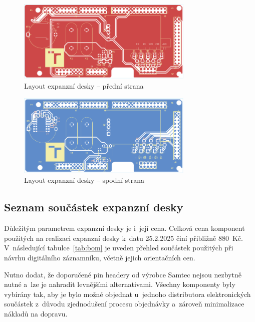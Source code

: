 \begin{figure}[h]
    \centering
    \includegraphics[width=0.75\textwidth]{obrazky-figures/extension_shield-brd-front.pdf}
    
    \caption{Layout expanzní desky -- přední strana}
    \label{fig:layout-front}
\end{figure}

\begin{figure}[h]
    \centering
    \includegraphics[width=0.75\textwidth]{obrazky-figures/extension_shield-brd-back.pdf}
    
    \caption{Layout expanzní desky -- spodní strana}
    \label{fig:layout-back}
\end{figure}

\newpage


\subsection{Seznam součástek expanzní desky}
\label{bom_list}

Důležitým parametrem expanzní desky je i~její cena. Celková cena komponent použitých na realizaci expanzní desky k~datu 25.2.2025 činí přibližně 880~Kč. V~následující tabulce~\ref{tab:bom} je uveden přehled součástek použitých při návrhu digitálního záznamníku, včetně jejich orientačních cen. 

Nutno dodat, že doporučené pin headery od výrobce Samtec nejsou nezbytně nutné a~lze je nahradit levnějšími alternativami. Všechny komponenty byly vybírány tak, aby je bylo možné objednat u~jednoho distributora elektronických součástek z~důvodu zjednodušení procesu objednávky a~zároveň minimalizace nákladů na dopravu.

